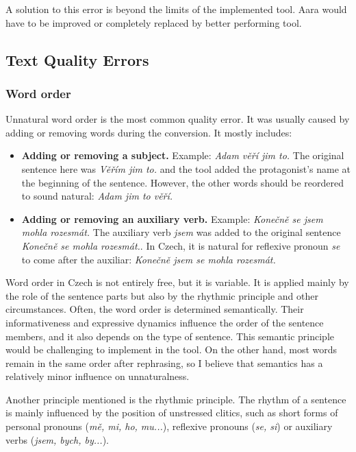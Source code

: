 A solution to this error is beyond the limits of the implemented tool. Aara would have to be improved or completely replaced by better performing tool.

\subsection{Text Quality Errors}

\subsubsection{Word order}

Unnatural word order is the most common quality error. It was usually caused by adding or removing words during the conversion. It mostly includes:

\begin{itemize}
	\item \textbf{Adding or removing a subject.} Example: \emph{Adam věří jim to.} The original sentence here was \emph{Věřím jim to.} and the tool added the protagonist's name at the beginning of the sentence. However, the other words should be reordered to sound natural: \emph{Adam jim to věří.}
	\item \textbf{Adding or removing an auxiliary verb.} Example: \emph{Konečně se jsem mohla rozesmát.} The auxiliary verb \emph{jsem} was added to the original sentence \emph{Konečně se mohla rozesmát.}. In Czech, it is natural for reflexive pronoun \emph{se} to come after the auxiliar: \emph{Konečně jsem se mohla rozesmát.}
\end{itemize}

Word order in Czech is not entirely free, but it is variable. It is applied mainly by the role of the sentence parts but also by the rhythmic principle and other circumstances. Often, the word order is determined semantically. Their informativeness and expressive dynamics influence the order of the sentence members, and it also depends on the type of sentence. \cite{vlasin-slovnik} This semantic principle would be challenging to implement in the tool. On the other hand, most words remain in the same order after rephrasing, so I believe that semantics has a relatively minor influence on unnaturalness.

Another principle mentioned is the rhythmic principle. The rhythm of a sentence is mainly influenced by the position of unstressed clitics, such as short forms of personal pronouns (\emph{mě, mi, ho, mu...}), reflexive pronouns (\emph{se, si}) or auxiliary verbs (\emph{jsem, bych, by...}). \cite{vlasin-slovnik}

